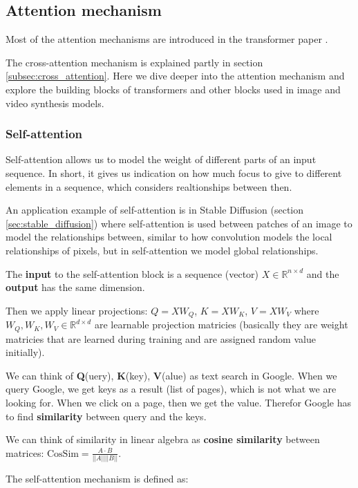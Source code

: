 \subsection{Attention mechanism}
\label{appendix:attention}

Most of the attention mechanisms are introduced in the transformer paper \cite{transformer}.

The cross-attention mechanism is explained partly in section \ref{subsec:cross_attention}. Here we dive deeper into the attention mechanism and explore the building blocks of transformers and other blocks used in image and video synthesis models.


\subsubsection{Self-attention}

Self-attention allows us to model the weight of different parts of an input sequence. In short, it gives us indication on how much focus to give to different elements in a sequence, which considers realtionships between then.

An application example of self-attention is in Stable Diffusion (section \ref{sec:stable_diffusion}) where self-attention is used between patches of an image to model the relationships between, similar to how convolution models the local relationships of pixels, but in self-attention we model global relationships.

The \textbf{input} to the self-attention block is a sequence (vector) $X \in \mathbb{R}^{n \times d}$ and the \textbf{output} has the same dimension.

Then we apply linear projections: $Q = XW_Q$, $K = XW_K$, $V = XW_V$ where $W_Q, W_K, W_V \in \mathbb{R}^{d \times d}$ are learnable projection matricies (basically they are weight matricies that are learned during training and are assigned random value initially).

We can think of \textbf{Q}(uery), \textbf{K}(key), \textbf{V}(alue) as text search in Google. When we query Google, we get keys as a result (list of pages), which is not what we are looking for. When we click on a page, then we get the value. Therefor Google has to find \textbf{similarity} between query and the keys.

We can think of similarity in linear algebra as \textbf{cosine similarity} between matrices: $\text{CosSim} = \frac{A \cdot B}{||A|| ||B||}$.

The self-attention mechanism is defined as:

